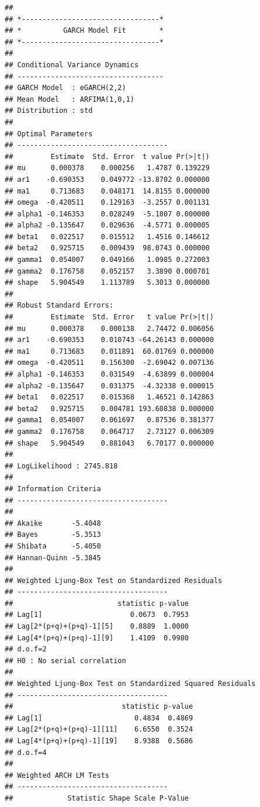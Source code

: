 \documentclass[
  12pt,
  a4paper,
  openany]{book}
\begin{document}
\begin{verbatim}
## 
## *---------------------------------*
## *          GARCH Model Fit        *
## *---------------------------------*
## 
## Conditional Variance Dynamics    
## -----------------------------------
## GARCH Model  : eGARCH(2,2)
## Mean Model   : ARFIMA(1,0,1)
## Distribution : std 
## 
## Optimal Parameters
## ------------------------------------
##         Estimate  Std. Error  t value Pr(>|t|)
## mu      0.000378    0.000256   1.4787 0.139229
## ar1    -0.690353    0.049772 -13.8702 0.000000
## ma1     0.713683    0.048171  14.8155 0.000000
## omega  -0.420511    0.129163  -3.2557 0.001131
## alpha1 -0.146353    0.028249  -5.1807 0.000000
## alpha2 -0.135647    0.029636  -4.5771 0.000005
## beta1   0.022517    0.015512   1.4516 0.146612
## beta2   0.925715    0.009439  98.0743 0.000000
## gamma1  0.054007    0.049166   1.0985 0.272003
## gamma2  0.176758    0.052157   3.3890 0.000701
## shape   5.904549    1.113789   5.3013 0.000000
## 
## Robust Standard Errors:
##         Estimate  Std. Error   t value Pr(>|t|)
## mu      0.000378    0.000138   2.74472 0.006056
## ar1    -0.690353    0.010743 -64.26143 0.000000
## ma1     0.713683    0.011891  60.01769 0.000000
## omega  -0.420511    0.156300  -2.69042 0.007136
## alpha1 -0.146353    0.031549  -4.63899 0.000004
## alpha2 -0.135647    0.031375  -4.32338 0.000015
## beta1   0.022517    0.015368   1.46521 0.142863
## beta2   0.925715    0.004781 193.60838 0.000000
## gamma1  0.054007    0.061697   0.87536 0.381377
## gamma2  0.176758    0.064717   2.73127 0.006309
## shape   5.904549    0.881043   6.70177 0.000000
## 
## LogLikelihood : 2745.818 
## 
## Information Criteria
## ------------------------------------
##                     
## Akaike       -5.4048
## Bayes        -5.3513
## Shibata      -5.4050
## Hannan-Quinn -5.3845
## 
## Weighted Ljung-Box Test on Standardized Residuals
## ------------------------------------
##                         statistic p-value
## Lag[1]                     0.0673  0.7953
## Lag[2*(p+q)+(p+q)-1][5]    0.8889  1.0000
## Lag[4*(p+q)+(p+q)-1][9]    1.4109  0.9980
## d.o.f=2
## H0 : No serial correlation
## 
## Weighted Ljung-Box Test on Standardized Squared Residuals
## ------------------------------------
##                          statistic p-value
## Lag[1]                      0.4834  0.4869
## Lag[2*(p+q)+(p+q)-1][11]    6.6550  0.3524
## Lag[4*(p+q)+(p+q)-1][19]    8.9388  0.5686
## d.o.f=4
## 
## Weighted ARCH LM Tests
## ------------------------------------
##             Statistic Shape Scale P-Value

\end{verbatim}
\end{document}
